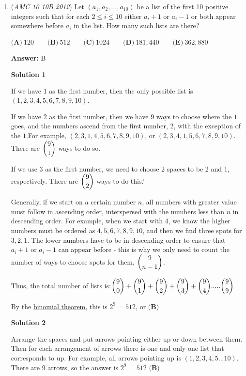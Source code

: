 \begin{enumerate}
 \href{https://artofproblemsolving.com/videos/amc/2012amc10b/271}{https://artofproblemsolving.com/videos/amc/2012amc10b/271}

 


	\item (\textit{AMC 10 10B 2012}) Let $(a_1,a_2, \dots ,a_{10})$ be a list of the first 10 positive integers such that for each $2 \le i \le 10$ either $a_i+1$ or $a_i-1$ or both appear somewhere before $a_i$ in the list. How many such lists are there?


 $\textbf{(A)}\ 120\qquad\textbf{(B)}\ 512\qquad\textbf{(C)}\ 1024\qquad\textbf{(D)}\ 181,440\qquad\textbf{(E)}\ 362,880$

 \textbf{Answer: }B



\textbf{Solution 1}

If we have 1 as the first number, then the only possible list is $(1,2,3,4,5,6,7,8,9,10)$. 

 If we have 2 as the first number, then we have 9 ways to choose where the $1$ goes, and the numbers ascend from the first number, $2$, with the exception of the $1$.For example, $(2,3,1,4,5,6,7,8,9,10)$, or $(2,3,4,1,5,6,7,8,9,10)$. There are $\dbinom{9}{1}$ ways to do so.

 If we use 3 as the first number, we need to choose 2 spaces to be 2 and 1, respectively. There are $\dbinom{9}{2}$ ways to do this.'

 Generally, if we start on a certain number $n$, all numbers with greater value must follow in ascending order, interspersed with the numbers less than $n$ in descending order. For example, when we start with 4, we know the higher numbers must be ordered as $4,5,6,7,8,9,10$, and then we find three spots for $3,2,1$. The lower numbers have to be in descending order to ensure that $a_i + 1$ or $a_i -1$ can appear before - this is why we only need to count the number of ways to choose spots for them, $\dbinom{9}{n-1}$.  

 Thus, the total number of lists is:$\dbinom{9}{0} +\dbinom{9}{1} + \dbinom{9}{2} + \dbinom{9}{3} + \dbinom{9}{4}.....\dbinom{9}{9}$

 By the \href{https://artofproblemsolving.com/wiki/index.php?title=Binomial\_theorem}{binomial theorem}, this is $2^{9}$ = $512$, or $\boxed{\textbf{(B)}}$




\textbf{Solution 2}

Arrange the spaces and put arrows pointing either up or down between them. Then for each arrangement of arrows there is one and only one list that corresponds to up. For example, all arrows pointing up is $(1,2,3,4,5...10)$. There are 9 arrows, so the answer is $2^{9}$ = $512$ $\boxed{\textbf{(B)}}$


\end{enumerate}
